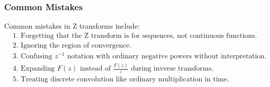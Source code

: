\subsubsection*{Common Mistakes}

\begin{conceptbox}
    Common mistakes in Z transforms include:
    \[
        \begin{aligned}
             & \text{1. Forgetting that the Z transform is for sequences, not continuous functions.}              \\
             & \text{2. Ignoring the region of convergence.}                                                      \\
             & \text{3. Confusing } z^{-1} \text{ notation with ordinary negative powers without interpretation.} \\
             & \text{4. Expanding } F(z) \text{ instead of } \frac{F(z)}{z} \text{ during inverse transforms.}    \\
             & \text{5. Treating discrete convolution like ordinary multiplication in time.}
        \end{aligned}
    \]
\end{conceptbox}